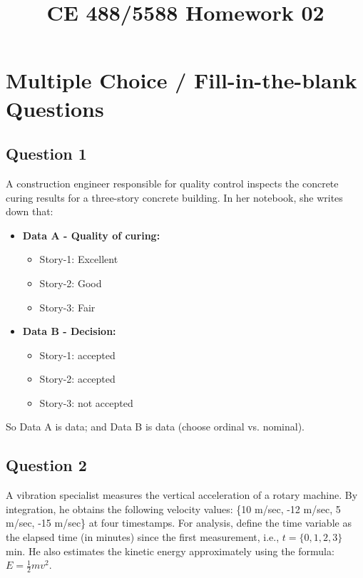 \documentclass[12pt]{article}
\begin{document}
\title{CE 488/5588 Homework 02\\
\vspace{2in}
\author{}
}
\maketitle
\newpage



\section*{Multiple Choice / Fill-in-the-blank Questions}
\subsection*{Question 1}
A construction engineer responsible for quality control inspects the concrete curing results for a three-story concrete building. In her notebook, she writes down that:

\begin{itemize}
    \item \textbf{Data A - Quality of curing:}
    \begin{itemize}
        \item Story-1: Excellent
        \item Story-2: Good
        \item Story-3: Fair
    \end{itemize}
    \item \textbf{Data B - Decision:}
    \begin{itemize}
        \item Story-1: accepted
        \item Story-2: accepted
        \item Story-3: not accepted
    \end{itemize}
\end{itemize}

So Data A is \underline{\hspace{4cm}} data; and Data B is \underline{\hspace{4cm}} data (choose ordinal vs. nominal).

\subsection*{Question 2}
A vibration specialist measures the vertical acceleration of a rotary machine. By integration, he obtains the following velocity values: \{10 m/sec, -12 m/sec, 5 m/sec, -15 m/sec\} at four timestamps. For analysis, define the time variable as the elapsed time (in minutes) since the first measurement, i.e., \(t=\{0,1,2,3\}\) min. He also estimates the kinetic energy approximately using the formula: \(E = \frac{1}{2} m v^2\).
\end{document}
